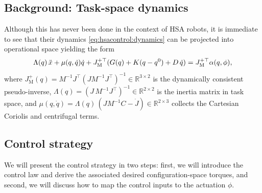 \subsection{Background: Task-space dynamics}\label{sub:hsacontrol:task_space_dynamics}
%
Although this has never been done in the context of HSA robots, it is immediate to see that their dynamics \eqref{eq:hsacontrol:dynamics} can be projected into operational space yielding the form~\citep{della2019exact, della2020model} %
\begin{equation}\label{eq:hsacontrol:operational_space_dynamics}
    \Lambda(q) \, \Ddot{x} + \mu(q,\dot{q}) \dot{q} + J_\mathrm{M}^{+\top} ( G(q) + K (q-q^0) + D \, \dot{q} ) = J_\mathrm{M}^{+\top} \alpha(q,\phi),
\end{equation}
where $J_\mathrm{M}^+(q) = M^{-1} J^\top(J M^{-1} J^\top)^{-1} \in \mathbb{R}^{3\times2}$ is the dynamically consistent pseudo-inverse, $\Lambda(q) = (J \, M^{-1} J^\top)^{-1} \in \mathbb{R}^{2 \times 2}$ is the inertia matrix in task space, and $\mu(q, \dot{q}) = \Lambda(q) \, (J M^{-1} C - \dot{J}) \in \mathbb{R}^{2 \times 3}$ collects the Cartesian Coriolis and centrifugal terms. %

\subsection{Control strategy}\label{sub:hsacontrol:task_space_impedance_control:control_strategy}
%
We will present the control strategy in two steps: first, we will introduce the control law and derive the associated desired configuration-space torques, and second, we will discuss how to map the control inputs to the actuation $\phi$.

